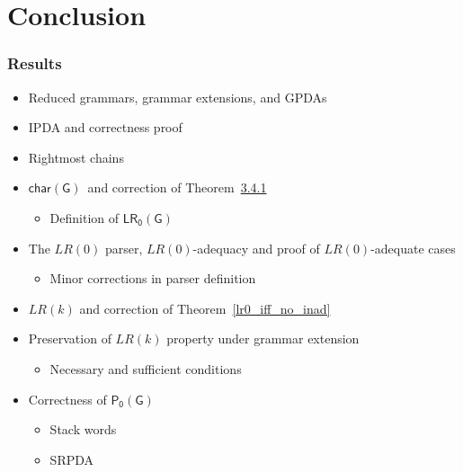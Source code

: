 \documentclass{beamer}
\newcommand{\charfa}{\ensuremath{\mathsf{char(G)}}}
\newcommand{\lrdfa}{\ensuremath{\mathsf{LR_0(G)}}}
\newcommand{\parser}{\ensuremath{\mathsf{P_0(G)}}}
\begin{document}
\section{Conclusion}

\begin{frame}
  \frametitle{Results}
  \begin{itemize}
    \item Reduced grammars, grammar extensions, and GPDAs
    \item IPDA and correctness proof 
    \item Rightmost chains
    \item \charfa\ and correction of Theorem~\hyperref[thm341]{3.4.1}
    \begin{itemize}
      \item Definition of \lrdfa
    \end{itemize}
    \item The $LR(0)$ parser, $LR(0)$-adequacy and proof of $LR(0)$-adequate
    cases
    \begin{itemize}
      \item Minor corrections in parser definition
    \end{itemize}
    \item $LR(k)$ and correction of Theorem~\ref{lr0_iff_no_inad}
    \item Preservation of $LR(k)$ property under grammar extension
    \begin{itemize}
      \item Necessary and sufficient conditions
    \end{itemize}
    \item Correctness of \parser
    \begin{itemize}
      \item Stack words
      \item SRPDA
    \end{itemize}
  \end{itemize}
\end{frame}
\end{document}
